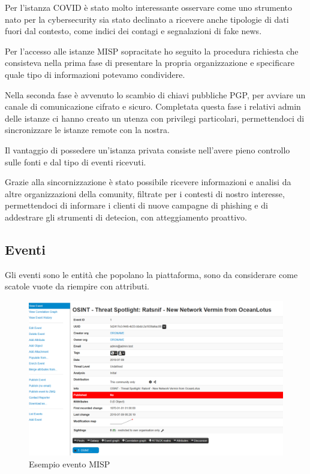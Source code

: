 \newpage

Per l’istanza COVID è stato molto interessante osservare come uno strumento nato per la cybersecurity sia stato declinato a ricevere anche tipologie di dati fuori dal contesto, come indici dei contagi e segnalazioni di fake news.\par
Per l’accesso alle istanze MISP sopracitate ho seguito la procedura richiesta che consisteva nella prima fase di presentare la propria organizzazione e specificare quale tipo di informazioni potevamo condividere.\par
Nella seconda fase è avvenuto lo scambio di chiavi pubbliche PGP, per avviare un canale di comunicazione cifrato e sicuro. Completata questa fase i relativi admin delle istanze ci hanno creato un utenza con privilegi particolari, permettendoci di sincronizzare le istanze remote con la nostra.\par
Il vantaggio di possedere un’istanza privata consiste nell’avere pieno controllo sulle fonti e dal tipo di eventi ricevuti.\par
Grazie alla sincornizzazione è stato possibile ricevere informazioni e analisi da altre organizzazioni della comunity, filtrate per i contesti di nostro interesse, permettendoci di informare i clienti di nuove campagne di phishing e di addestrare gli strumenti di detecion, con atteggiamento proattivo.

\subsection{Eventi}

Gli eventi sono le entità che popolano la piattaforma, sono da considerare come scatole vuote da riempire con attributi.

\begin{figure}[h]
    \begin{center}
        \includegraphics[width=0.90\columnwidth]{images/4_caso_d'uso_img/eventMISp.png}
    \end{center}
    \caption{Esempio evento MISP}
    \label{fig:Esempio evento MISP}
\end{figure}  

